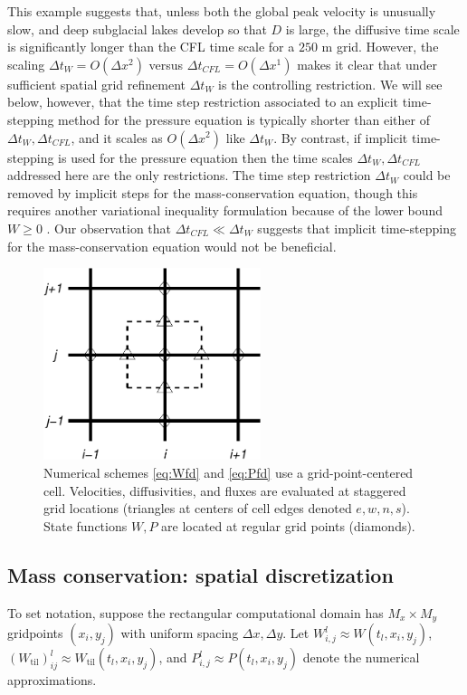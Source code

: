 \documentclass[gmd]{copernicus}   %
\newcommand{\text}{\textrm}
\newcommand{\Wtil}{W_{\text{til}}}
\newcommand{\Wlij}{W^l_{i,j}}
\newcommand{\Plij}{P^l_{i,j}}
\begin{document}
This example suggests that, unless both the global peak velocity is unusually slow, and deep subglacial lakes develop so that $D$ is large, the diffusive time scale is significantly longer than the CFL time scale for a $250$ m grid.  However, the scaling $\Delta t_W = O(\Delta x^2)$ versus $\Delta t_{CFL} = O(\Delta x^1)$ makes it clear that under sufficient spatial grid refinement $\Delta t_W$ is the controlling restriction.  We will see below, however, that the time step restriction associated to an explicit time-stepping method for the pressure equation is typically shorter than either of $\Delta t_W,\Delta t_{CFL}$, and it scales as $O(\Delta x^2)$ like $\Delta t_W$.  By contrast, if implicit time-stepping is used for the pressure equation \citep{Hewittetal2012,Schoofetal2012} then the time scales $\Delta t_W, \Delta t_{CFL}$ addressed here are the only restrictions.  The time step restriction $\Delta t_W$ could be removed by implicit steps for the mass-conservation equation, though this requires another variational inequality formulation because of the lower bound $W\ge 0$ \citep[compare][]{JouvetBueler2012}.  Our observation that $\Delta t_{CFL} \ll \Delta t_W$ suggests that implicit time-stepping for the mass-conservation equation would not be beneficial.

\begin{figure}[ht]
\centering
\includegraphics[width=2.5in,keepaspectratio=true]{diffstencil}
\bigskip
\caption{Numerical schemes \eqref{eq:Wfd} and \eqref{eq:Pfd} use a grid-point-centered cell.  Velocities, diffusivities, and fluxes are evaluated at staggered grid locations (triangles at centers of cell edges denoted $e,w,n,s$).  State functions $W,P$ are located at regular grid points (diamonds).}
\label{fig:stencil}
\end{figure}

\subsection{Mass conservation: spatial discretization}  To set notation, suppose the rectangular computational domain has $M_x \times M_y$ gridpoints $(x_i,y_j)$ with uniform spacing $\Delta x,\Delta y$.  Let $\Wlij \approx W(t_l,x_i,y_j)$, $(\Wtil)_{ij}^l \approx \Wtil(t_l,x_i,y_j)$, and $\Plij \approx P(t_l,x_i,y_j)$ denote the numerical approximations.
\end{document}
